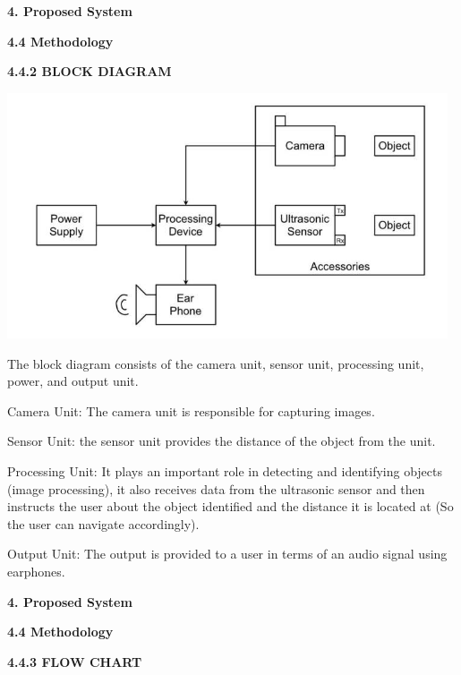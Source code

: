 \documentclass{article}
\begin{document}
\textbf{4. Proposed System}

\textbf{4.4 Methodology}

\textbf{4.4.2 BLOCK DIAGRAM}

\includegraphics[width=5.12222in,height=2.85625in]{media/13.jpg}

The block diagram consists of the camera unit, sensor unit, processing
unit, power, and output unit.

{Camera Unit}: The camera unit is responsible for capturing images.

{Sensor Unit}: the sensor unit provides the distance of the object from
the unit.

{Processing Unit}: It plays an important role in detecting and
identifying objects (image processing), it also receives data from the
ultrasonic sensor and then instructs the user about the object
identified and the distance it is located at (So the user can navigate
accordingly).

{Output Unit}: The output is provided to a user in terms of an audio
signal using earphones.

\textbf{4. Proposed System}

\textbf{4.4 Methodology}

\textbf{4.4.3 FLOW CHART}
\end{document}
